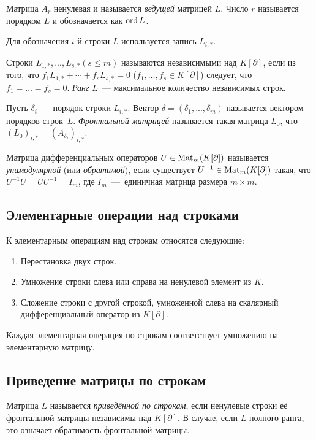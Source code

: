         Матрица $A_r$ ненулевая и
        называется \emph{ведущей} матрицей $L$. Число $r$ называется порядком $L$
        и обозначается как $\mathop{\mathrm{ord}}\nolimits L$.


        Для обозначения $i$-й строки $L$ используется запись $L_{i,*}$.


        Строки $L_{1,*},...,L_{s,*} (s\leq m)$ называются независимыми над $K[\partial]$, если из того, что $f_1L_{1,*}+\cdots+f_sL_{s,*}=0$
        ($f_1,\ldots,f_s \in K[\partial]$) следует, что $f_1=\ldots=f_s=0$.
        \emph{Ранг} $L$~--- максимальное количество независимых строк.


        Пусть $\delta_i$~--- порядок строки $L_{i,*}$. Вектор
        $\delta=(\delta_1,...,\delta_m)$ называется вектором порядков строк~$L$.
        \emph{Фронтальной матрицей} называется такая матрица $L_0$, что $(L_0)_{i,*}=(A_{\delta_i})_{i,*}$.


        Матрица дифференциальных операторов $U \in \mathop{\mathrm{Mat}}\nolimits_m(K[\partial])$ называется \emph{унимодулярной} (или \emph{обратимой}), 
        если существует $U^{-1} \in \mathop{\mathrm{Mat}}\nolimits_m(K[\partial])$ такая, что $U^{-1}U=UU^{-1}=I_m$, где 
        $I_m$~---~единичная матрица размера $m\times m$.
        \subsection{Элементарные операции над строками}
        К элементарным операциям над строкам относятся следующие:
        \begin{enumerate}
            \item Перестановка двух строк.
            \item Умножение строки слева или справа на ненулевой элемент из $K$.
            \item Сложение строки с другой строкой, умноженной слева на 
            скалярный дифференциальный оператор из $K[\partial]$.
        \end{enumerate}


        Каждая элементарная операция по строкам соответствует умножению на элементарную 
        матрицу.
    \subsection{Приведение матрицы по строкам}
        Матрица $L$ называется \emph{приведённой по строкам}, если ненулевые строки
        её фронтальной матрицы независимы над $K[\partial]$. В случае, если $L$ полного ранга, 
        это означает обратимость фронтальной матрицы.


